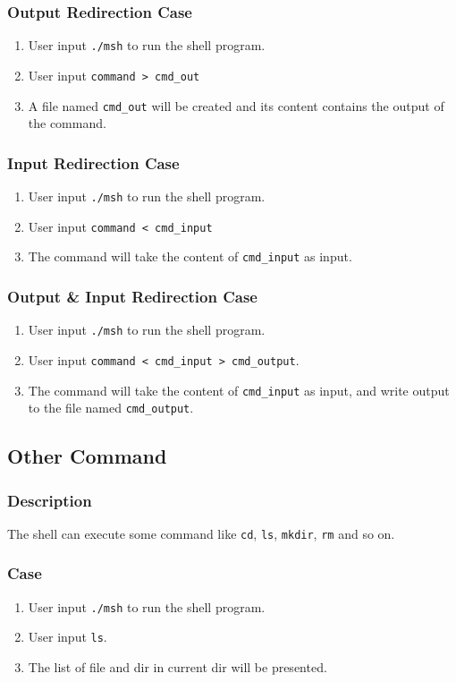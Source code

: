 \documentclass{article}
\begin{document}
\subsubsection{Output Redirection Case}
\begin{enumerate}
\item User input \verb|./msh| to run the shell program.
\item User input \verb|command > cmd_out|
\item A file named \verb|cmd_out| will be created and its content contains the output of the command.
\end{enumerate}

\subsubsection{Input Redirection Case}
\begin{enumerate}
\item User input \verb|./msh| to run the shell program.
\item User input \verb|command < cmd_input|
\item The command will take the content of \verb|cmd_input| as input.
\end{enumerate}

\subsubsection{Output \& Input Redirection Case}
\begin{enumerate}
\item User input \verb|./msh| to run the shell program.
\item User input \verb|command < cmd_input > cmd_output|.
\item The command will take the content of \verb|cmd_input| as input, and write output to the file named \verb|cmd_output|.
\end{enumerate}

\subsection{Other Command}
\subsubsection{Description}
The shell can execute some command like \verb|cd|, \verb|ls|, \verb|mkdir|, \verb|rm| and so on.

\subsubsection{Case}
\begin{enumerate}
\item User input \verb|./msh| to run the shell program.
\item User input \verb|ls|.
\item The list of file and dir in current dir will be presented.
\end{enumerate}
\end{document}
